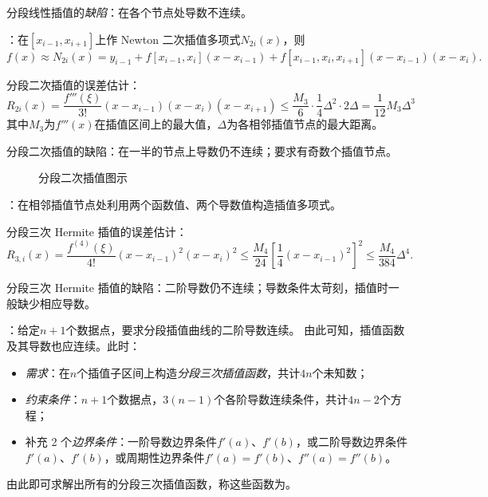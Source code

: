 \entry 分段线性插值的\emph{缺陷}：在各个节点处导数不连续。

\entry {}：在$[x_{i-1},x_{i+1}]$上作 Newton 二次插值多项式$N_{2i}(x)$，则
\begin{equation}
f(x)\approx N_{2i}(x)=y_{i-1}+f[x_{i-1},x_i](x-x_{i-1})+f[x_{i-1},x_i,x_{i+1}]
(x-x_{i-1})(x-x_i).
\end{equation}

\entry 分段二次插值的误差估计：
\begin{equation}
R_{2i}(x)=\frac{f'''(\xi)}{3!}(x-x_{i-1})(x-x_i)(x-x_{i+1})\leq\frac{M_3}6\cdot
\frac14\Delta^2\cdot2\Delta=\frac1{12}M_3\Delta^3
\end{equation}
其中$M_3$为$f'''(x)$在插值区间上的最大值，$\Delta$为各相邻插值节点的最大距离。

\entry 分段二次插值的缺陷：在一半的节点上导数仍不连续；要求有奇数个插值节点。

\begin{figure}[htbp]
\small\centering
{}
\caption{分段二次插值图示}\label{4-f4}
\end{figure}

\entry {}：在相邻插值节点处利用两个函数值、两个导数值构造插值多项式。

\entry 分段三次 Hermite 插值的误差估计：
\begin{equation}
R_{3,i}(x)=\frac{f^{(4)}(\xi)}{4!}(x-x_{i-1})^2(x-x_i)^2\leq\frac{M_4}{24}
\left[\frac14(x-x_{i-1})^2\right]^2\leq\frac{M_4}{384}\Delta^4.
\end{equation}

\entry 分段三次 Hermite 插值的缺陷：二阶导数仍不连续；导数条件太苛刻，插值时一般缺少相应导数。

\entry {}：给定$n+1$个数据点，要求分段插值曲线的二阶导数连续。
由此可知，插值函数及其导数也应连续。此时：
\begin{itemize}\tl
    \item \emph{需求}：在$n$个插值子区间上构造\emph{分段三次插值函数}，共计$4n$个未知数；
    \item \emph{约束条件}：$n+1$个数据点，$3(n-1)$个各阶导数连续条件，共计$4n-2$个方程；
    \item 补充 2 个\emph{边界条件}：一阶导数边界条件$f'(a)$、$f'(b)$，或二阶导数边界条件
    $f'(a)$、$f'(b)$，或周期性边界条件$f'(a)=f'(b)$、$f''(a)=f''(b)$。
\end{itemize}
由此即可求解出所有的分段三次插值函数，称这些函数为。

